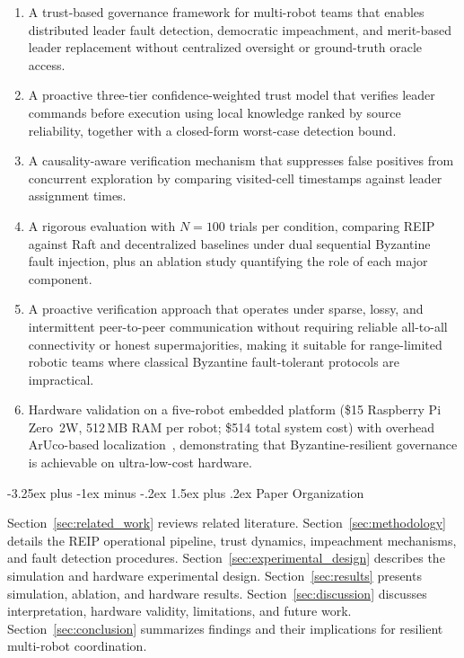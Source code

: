 \documentclass[conference]{IEEEtran}
\makeatletter
\renewcommand{\subsection}{\@startsection{subsection}{2}{\z@}%
  {-3.25ex plus -1ex minus -.2ex}%
  {1.5ex plus .2ex}%
  {\normalfont\normalsize\itshape\centering}}
\makeatother
\begin{document}
\begin{enumerate}[leftmargin=*]
    \item A trust-based governance framework for multi-robot teams that enables distributed leader fault detection, democratic impeachment, and merit-based leader replacement without centralized oversight or ground-truth oracle access.
    \item A proactive three-tier confidence-weighted trust model that verifies leader commands before execution using local knowledge ranked by source reliability, together with a closed-form worst-case detection bound.
    \item A causality-aware verification mechanism that suppresses false positives from concurrent exploration by comparing visited-cell timestamps against leader assignment times.
    \item A rigorous evaluation with $N{=}100$ trials per condition, comparing REIP against Raft and decentralized baselines under dual sequential Byzantine fault injection, plus an ablation study quantifying the role of each major component.
    \item A proactive verification approach that operates under sparse, lossy, and intermittent peer-to-peer communication without requiring reliable all-to-all connectivity or honest supermajorities, making it suitable for range-limited robotic teams where classical Byzantine fault-tolerant protocols are impractical.
    \item Hardware validation on a five-robot embedded platform (\$15 Raspberry Pi Zero~2W, 512\,MB RAM per robot; \$514 total system cost) with overhead ArUco-based localization~\cite{garrido2014aruco}, demonstrating that Byzantine-resilient governance is achievable on ultra-low-cost hardware.

\end{enumerate}

\subsection{Paper Organization}

Section~\ref{sec:related_work} reviews related literature. Section~\ref{sec:methodology} details the REIP operational pipeline, trust dynamics, impeachment mechanisms, and fault detection procedures. Section~\ref{sec:experimental_design} describes the simulation and hardware experimental design. Section~\ref{sec:results} presents simulation, ablation, and hardware results. Section~\ref{sec:discussion} discusses interpretation, hardware validity, limitations, and future work. Section~\ref{sec:conclusion} summarizes findings and their implications for resilient multi-robot coordination.
\end{document}

